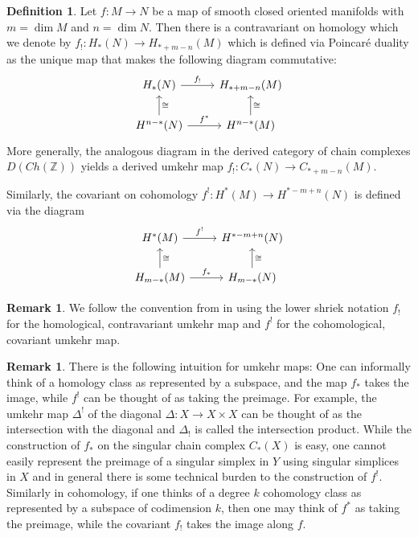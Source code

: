 \documentclass{scrartcl}
\let\emph\relax
\newcommand{\emphi}[1]{\index{#1}\emph{#1}}
\theoremstyle{plain}
\theoremstyle{definition}
\newtheorem{definition}[theorem]{Definition}
\newtheorem{remark}[theorem]{Remark}
\newcommand{\Z}{\mathbb Z}
\newcommand{\iso}{\cong}
\begin{document}
\begin{definition}
Let $f\colon M\to  N$ be a map of smooth closed oriented manifolds with $m=\dim M$ and $n=\dim N$. Then there is a contravariant \emphi{umkehr map} on homology which we denote by $f_!\colon H_*(N)\to H_{*+m-n}(M)$ which is defined via Poincaré duality as the unique map that makes the following diagram commutative:
\begin{equation}
    \begin{tikzcd}
        H_*(N)  \rar["f_!"] & H_{*+m-n}(M)  \\
        H^{n-*}(N) \uar[swap, "\iso"]\rar["f^*"] & H^{n-*}(M) \uar[swap, "\iso"]
    \end{tikzcd}
\end{equation}
More generally, the analogous diagram in the derived category of chain complexes $D(Ch(\Z))$ yields a derived umkehr map $f_! \colon C_*(N) \to C_{*+m-n}(M)$.

Similarly, the covariant \emph{umkehr map} on cohomology $f^!\colon H^*(M)\to H^{*-m+n}(N)$ is defined via the diagram
\begin{equation}
    \begin{tikzcd}
        H^*(M)  \rar["f^!"] & H^{*-m+n}(N)  \\
        H_{m-*}(M) \uar[swap, "\iso"]\rar["f_*"] & H_{m-*}(N) \uar[swap, "\iso"]
    \end{tikzcd}
\end{equation}
\end{definition}

\begin{remark}
    We follow the convention from \cite{bredon2013topology} in using the lower shriek notation $f_!$ for the homological, contravariant umkehr map and $f^!$ for the cohomological, covariant umkehr map. 
\end{remark}

\begin{remark}
    There is the following intuition for umkehr maps: One can informally think of a homology class as represented by a subspace, and the map $f_*$ takes the image, while $f^!$ can be thought of as taking the preimage. For example, the umkehr map $\Delta^!$ of the diagonal $\Delta\colon X\to X\times X$ can be thought of as the intersection with the diagonal and $\Delta_!$ is called the intersection product. While the construction of $f_*$ on the singular chain complex $C_*(X)$ is easy, one cannot easily represent the preimage of a singular simplex in $Y$ using singular simplices in $X$ and in general there is some technical burden to the construction of $f^!$. Similarly in cohomology, if one thinks of a degree $k$ cohomology class as represented by a subspace of codimension $k$, then one may think of $f^*$ as taking the preimage, while the covariant $f_!$ takes the image along $f$. 
\end{remark}
\end{document}
